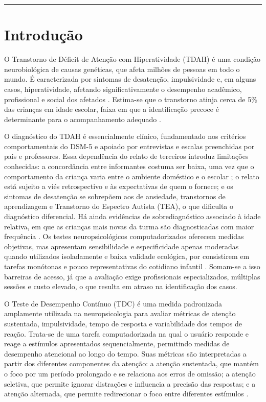 \documentclass[11pt,a4paper]{article}
\begin{document}
\vspace{0.5cm}

\noindent\rule{\textwidth}{0.5pt}
\vspace{0.5cm}

\section{Introdução}

O Transtorno de Déficit de Atenção com Hiperatividade (TDAH) é uma condição neurobiológica de causas genéticas, que afeta milhões de pessoas em todo o mundo. É caracterizada por sintomas de desatenção, impulsividade e, em alguns casos, hiperatividade, afetando significativamente o desempenho acadêmico, profissional e social dos afetados \cite{BVS2014}. Estima-se que o transtorno atinja cerca de 5\% das crianças em idade escolar, faixa em que a identificação precoce é determinante para o acompanhamento adequado \cite{Polanczyk2007}.

O diagnóstico do TDAH é essencialmente clínico, fundamentado nos critérios comportamentais do DSM-5 \cite{APA2013} e apoiado por entrevistas e escalas preenchidas por pais e professores. Essa dependência do relato de terceiros introduz limitações conhecidas: a concordância entre informantes costuma ser baixa, uma vez que o comportamento da criança varia entre o ambiente doméstico e o escolar \cite{DeLosReyes2005}; o relato está sujeito a viés retrospectivo e às expectativas de quem o fornece; e os sintomas de desatenção se sobrepõem aos de ansiedade, transtornos de aprendizagem e Transtorno do Espectro Autista (TEA), o que dificulta o diagnóstico diferencial. Há ainda evidências de sobrediagnóstico associado à idade relativa, em que as crianças mais novas da turma são diagnosticadas com maior frequência \cite{Morrow2012}. Os testes neuropsicológicos computadorizados oferecem medidas objetivas, mas apresentam sensibilidade e especificidade apenas moderadas quando utilizados isoladamente e baixa validade ecológica, por consistirem em tarefas monótonas e pouco representativas do cotidiano infantil \cite{Hall2016}. Somam-se a isso barreiras de acesso, já que a avaliação exige profissionais especializados, múltiplas sessões e custo elevado, o que resulta em atraso na identificação dos casos.

O Teste de Desempenho Contínuo (TDC) é uma medida padronizada amplamente
utilizada na neuropsicologia para avaliar métricas de atenção sustentada, impulsividade,
tempo de resposta e variabilidade dos tempos de reação. Trata-se de uma tarefa
computadorizada na qual o usuário responde e reage a estímulos apresentados
sequencialmente, permitindo medidas de desempenho atencional ao longo do tempo. Suas métricas são interpretadas a partir dos diferentes componentes da atenção: a atenção sustentada, que mantém o foco por um período prolongado e se relaciona aos erros de omissão; a atenção seletiva, que permite ignorar distrações e influencia a precisão das respostas; e a atenção alternada, que permite redirecionar o foco entre diferentes estímulos \cite{CULLUM1998303}.
\end{document}

